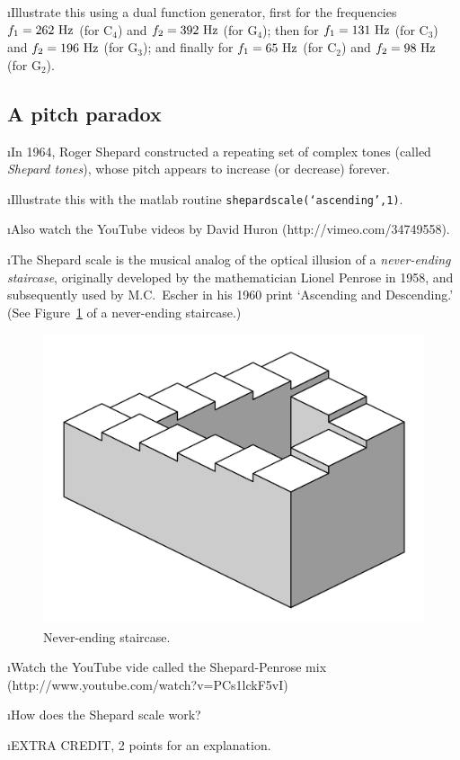 \i \demo Illustrate this using a dual function
generator, first for the frequencies 
$f_1 = 262~{\rm Hz}$ (for C${}_4$) and $f_2 = 392~{\rm Hz}$ (for G${}_4$);
then for
$f_1 = 131~{\rm Hz}$ (for C${}_3$) and $f_2 = 196~{\rm Hz}$ (for G${}_3$);
and finally for
$f_1 = 65~{\rm Hz}$ (for C${}_2$) and $f_2 = 98~{\rm Hz}$ (for G${}_2$).

\ei

\subsection{A pitch paradox}

\bi

\i In 1964, Roger Shepard constructed a repeating set of complex
tones (called {\em Shepard tones}), whose pitch appears to increase 
(or decrease) forever.

\i \demo Illustrate this with the matlab routine
{\tt shepardscale(`ascending',1)}.

\i \demo Also watch the YouTube videos by David Huron 
(http://vimeo.com/34749558).

\i The Shepard scale is the musical analog of the optical 
illusion of a
{\em never-ending staircase}, 
originally developed by the mathematician
Lionel Penrose in 1958, and subsequently used by M.C.~Escher in
his 1960 print `Ascending and Descending.'
(See Figure~\ref{f:penrose-staircase} of a never-ending staircase.)
%
\begin{figure}[htbp]
\begin{center}
\includegraphics[width=.4\textwidth]{penrose-staircase.png}
\caption{Never-ending staircase.}
\label{f:penrose-staircase}
\end{center}
\end{figure}
%

\i \demo Watch the YouTube vide called the Shepard-Penrose mix\\
(http://www.youtube.com/watch?v=PCs1lckF5vI)

\i \ques How does the Shepard scale work? 

\i \ans EXTRA CREDIT, 2 points for an explanation.

\ei

